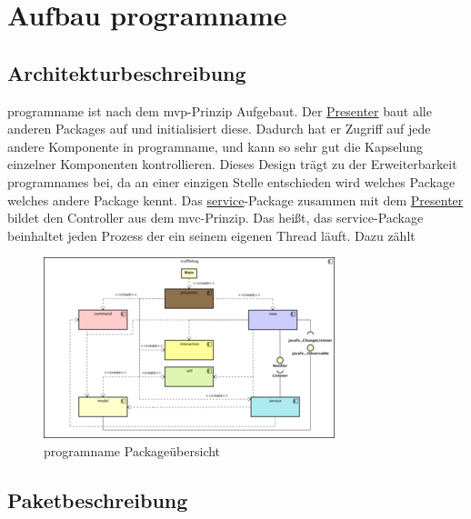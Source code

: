 \chapter{Aufbau \gls{programname}}
\label{ch:aufbau_programname}

\section{Architekturbeschreibung}

\gls{programname} ist nach dem \gls{mvp}-Prinzip Aufgebaut. Der
\hyperref[subsec:presenter]{Presenter} baut alle anderen Packages auf und
initialisiert diese. Dadurch hat er Zugriff auf jede andere Komponente in \gls{programname},
und kann so sehr gut die Kapselung einzelner Komponenten kontrollieren. Dieses Design
trägt zu der Erweiterbarkeit \gls{programname}s bei, da an einer einzigen
Stelle entschieden wird welches Package welches andere Package kennt.
\newline
\newline
Das \hyperref[subsec:service]{service}-Package zusammen mit dem \hyperref[subsec:presenter]{Presenter}
bildet den Controller aus dem \gls{mvc}-Prinzip. Das heißt, das service-Package
beinhaltet jeden Prozess der ein seinem eigenen Thread läuft. Dazu zählt

\begin{figure}[H]
  \centering
  \includegraphics[width=\textwidth]{../diagramimages/trufflehog-component.png}
  \caption{\gls{programname} Packageübersicht}
\end{figure}


\section{Paketbeschreibung}















\medskip
